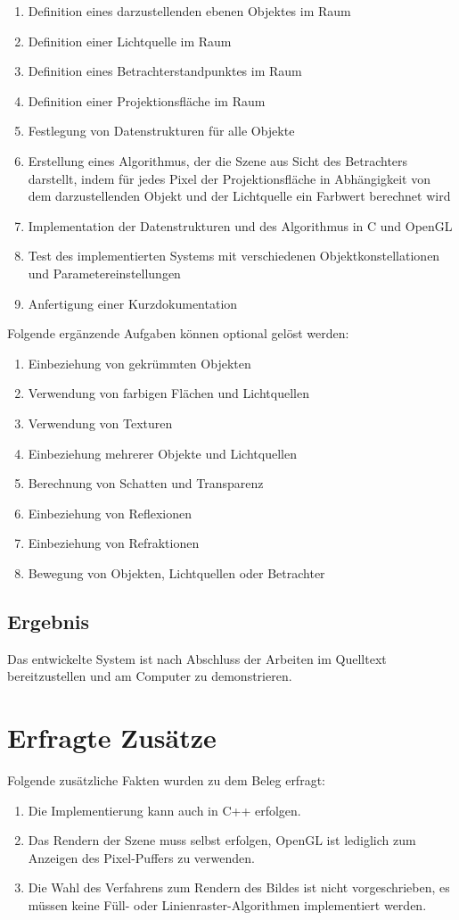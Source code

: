 \documentclass[final,a4paper,11pt,notitlepage,halfparskip]{scrreprt}
\begin{document}
\begin{enumerate}
    \item Definition eines darzustellenden ebenen Objektes im Raum
    \item Definition einer Lichtquelle im Raum
    \item Definition eines Betrachterstandpunktes im Raum
    \item Definition einer Projektionsfläche im Raum
    \item Festlegung von Datenstrukturen für alle Objekte
    \item Erstellung eines Algorithmus, der die Szene aus Sicht des Betrachters darstellt, indem
	für jedes Pixel der Projektionsfläche in Abhängigkeit von dem darzustellenden Objekt
	und der Lichtquelle ein Farbwert berechnet wird
    \item Implementation der Datenstrukturen und des Algorithmus in C und OpenGL
    \item Test des implementierten Systems mit verschiedenen Objektkonstellationen und
	Parametereinstellungen
    \item Anfertigung einer Kurzdokumentation
\end{enumerate}
Folgende ergänzende Aufgaben können optional gelöst werden:
\begin{enumerate}
    \item Einbeziehung von gekrümmten Objekten
    \item Verwendung von farbigen Flächen und Lichtquellen
    \item Verwendung von Texturen
    \item Einbeziehung mehrerer Objekte und Lichtquellen
    \item Berechnung von Schatten und Transparenz
    \item Einbeziehung von Reflexionen
    \item Einbeziehung von Refraktionen
    \item Bewegung von Objekten, Lichtquellen oder Betrachter
\end{enumerate}

\subsection{Ergebnis}
Das entwickelte System ist nach Abschluss der Arbeiten im Quelltext bereitzustellen und am
Computer zu demonstrieren.

\section{Erfragte Zusätze}
Folgende zusätzliche Fakten wurden zu dem Beleg erfragt:
\begin{enumerate}
    \item Die Implementierung kann auch in C++ erfolgen.
    \item Das Rendern der Szene muss selbst erfolgen, OpenGL ist lediglich zum 
	Anzeigen des Pixel-Puffers zu verwenden.
    \item Die Wahl des Verfahrens zum Rendern des Bildes ist nicht
	vorgeschrieben, es müssen keine Füll- oder Linienraster-Algorithmen
	implementiert werden.	
\end{enumerate}
\end{document}
